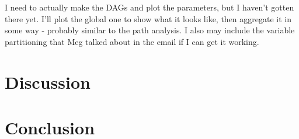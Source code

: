 \documentclass[
  authoryear,
  review,
  3p,
  twocolumn]{elsarticle}
\begin{document}
I need to actually make the DAGs and plot the parameters, but I haven't
gotten there yet. I'll plot the global one to show what it looks like,
then aggregate it in some way - probably similar to the path analysis. I
also may include the variable partitioning that Meg talked about in the
email if I can get it working.

\hypertarget{discussion}{%
\section{Discussion}\label{discussion}}

\hypertarget{conclusion}{%
\section{Conclusion}\label{conclusion}}

\newpage


\renewcommand\refname{References}
  
\end{document}
